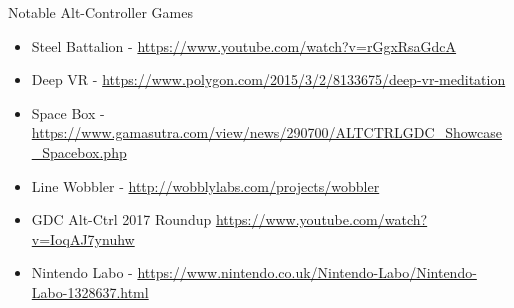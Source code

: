 \begin{frame}{Notable Alt-Controller Games}
\begin{itemize}
	\item Steel Battalion - \url{https://www.youtube.com/watch?v=rGgxRsaGdcA}
	\item Deep VR - \url{https://www.polygon.com/2015/3/2/8133675/deep-vr-meditation}
	\item Space Box - \url{https://www.gamasutra.com/view/news/290700/ALTCTRLGDC_Showcase_Spacebox.php}
	\item Line Wobbler - \url{http://wobblylabs.com/projects/wobbler}
	\item GDC Alt-Ctrl 2017 Roundup \url{https://www.youtube.com/watch?v=IoqAJ7ynuhw}
	\item Nintendo Labo - \url{https://www.nintendo.co.uk/Nintendo-Labo/Nintendo-Labo-1328637.html}
\end{itemize}
\end{frame}